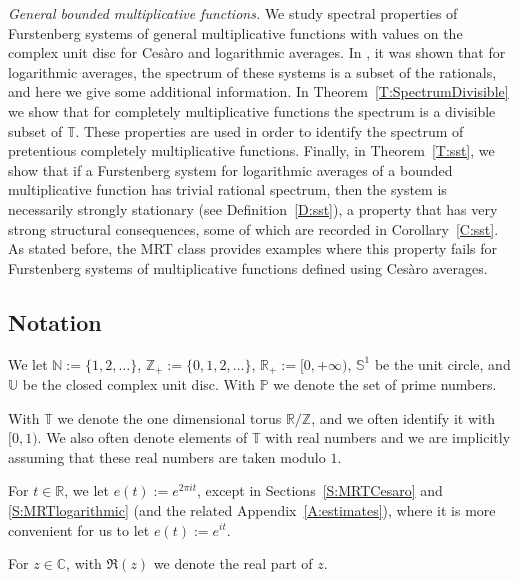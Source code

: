 \documentclass[11pt]{amsart}
\theoremstyle{definition}
\newcommand{\C}{{\mathbb C}}
\newcommand{\N}{{\mathbb N}}
\renewcommand{\P}{{\mathbb P}}
\newcommand{\R}{{\mathbb R}}
\renewcommand{\S}{\mathbb{S}}
\newcommand{\T}{{\mathbb T}}
\newcommand{\Z}{{\mathbb Z}}
\newcommand{\U}{{\mathbb U}}
\begin{document}
 {\em General bounded multiplicative functions.}  We study spectral properties of Furstenberg systems of general multiplicative functions with values on the complex unit disc for Ces\`aro and  logarithmic averages. In \cite{FH18}, it was shown that for logarithmic averages, the spectrum of these systems is a subset of the rationals, and here we give some additional information.  In  Theorem~\ref{T:SpectrumDivisible} we show that for  completely multiplicative functions  the  spectrum is a divisible subset of $\T$.  These properties are used in order to identify the spectrum of pretentious completely multiplicative functions. Finally, in Theorem~\ref{T:sst},  we show that if a Furstenberg system for logarithmic averages of a bounded multiplicative function has
  trivial  rational  spectrum, then the system  is necessarily  strongly stationary (see Definition~\ref{D:sst}), a property that has very strong  structural consequences, some of which are recorded in Corollary~\ref{C:sst}.  As stated before, the MRT class provides  examples where this property fails for  Furstenberg systems of  multiplicative functions  defined using   Ces\`aro averages.

\subsection{Notation} \label{SS:notation}
We let  $\N:=\{1,2,\ldots\}$,  $\Z_+:=\{0,1,2,\ldots \}$, $\R_+:=[0,+\infty)$, $\S^1$ be the unit circle, and $\U$ be  the closed complex unit disc.
With $\P$ we
denote the set of prime numbers.


With $\T$ we denote the one dimensional torus  $\R/\Z$, and we often identify it   with $[0,1)$.
We also often denote elements of $\T$ with  real numbers and we are implicitly  assuming that these real numbers are taken  modulo $1$.




For $t\in \R$, we let $e(t):=e^{2\pi i t}$, except in Sections~\ref{S:MRTCesaro} and \ref{S:MRTlogarithmic} (and the related Appendix~\ref{A:estimates}), where it is more convenient for us to let $e(t):=e^{it}$.


For $z\in \C$, with $\Re(z)$ we denote the real part of $z$.
\end{document}
